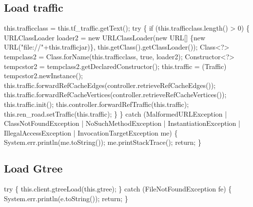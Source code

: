 \subsection{Load traffic}
\nwenddocs{}\endmoddef{}
this.trafficclass = this.tf_traffic.getText();
try \{
  if (this.trafficclass.length() > 0) \{
    URLClassLoader loader2 = new URLClassLoader(new URL[] \{new URL("file://"+this.trafficjar)\},
        this.getClass().getClassLoader());
    Class<?> tempclass2 = Class.forName(this.trafficclass, true, loader2);
    Constructor<?> tempcstor2 = tempclass2.getDeclaredConstructor();
    this.traffic = (Traffic) tempcstor2.newInstance();
    this.traffic.forwardRefCacheEdges(controller.retrieveRefCacheEdges());
    this.traffic.forwardRefCacheVertices(controller.retrieveRefCacheVertices());
    this.traffic.init();
    this.controller.forwardRefTraffic(this.traffic);
    this.ren_road.setTraffic(this.traffic);
  \}
\} catch (MalformedURLException
    | ClassNotFoundException
    | NoSuchMethodException
    | InstantiationException
    | IllegalAccessException
    | InvocationTargetException me) \{
  System.err.println(me.toString());
  me.printStackTrace();
  return;
\}
\nwendcode{}\nwdocspar

\subsection{Load Gtree}
\nwenddocs{}\endmoddef{}
try \{
  this.client.gtreeLoad(this.gtree);
\} catch (FileNotFoundException fe) \{
  System.err.println(e.toString());
  return;
\}
\nwendcode{}\nwdocspar


